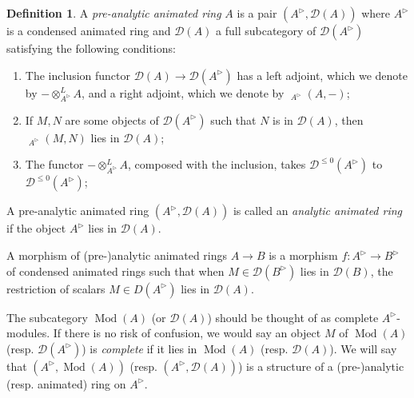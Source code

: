 \documentclass{article}
\theoremstyle{plain}
\theoremstyle{definition}
\newtheorem{defi}[thm]{Definition}
\theoremstyle{remark}
\DeclareMathOperator{\rhoms}{\underline{RHom}}
\DeclareMathOperator{\modcat}{Mod}
\newcommand{\dten}{\otimes ^{L}}
\newcommand{\huflag}{\triangleright}
\newcommand{\D}{\mathcal{D}}
\newcommand{\resp}[1]{{\color{respcolor}(resp. #1)}}
\begin{document}
\begin{defi}
A \emph{pre-analytic animated ring} $ A $ is a pair $ (A ^{\huflag}, \D(A)) $ where $ A ^{\huflag} $ is a condensed animated ring and
$ \D (A) $ a full subcategory of $ \D (A ^{\huflag}) $ satisfying the following conditions:

\begin{enumerate}
\item The inclusion functor $ \D (A)\to \D (A ^{\huflag}) $ has a left adjoint, which we denote by $ -\dten _{A ^{\huflag}} A $,
and a right adjoint, which we denote by $ \rhoms _{A ^{\huflag}}(A, -) $;
\item If $ M,N $ are some objects of $ \D (A ^{\huflag}) $ such that $ N $ is in $\D (A) $, then $ \rhoms _{A ^{\huflag}} (M, N) $ lies in $ \D (A) $;
\item The functor $ -\dten _{A ^{\huflag}} A $, composed with the inclusion, takes $ \D ^{\leq 0}(A ^{\huflag}) $ to $ \D ^{\leq 0}(A ^{\huflag}) $;
\end{enumerate}
A pre-analytic animated ring $ (A ^{\huflag}, \D (A)) $ is called an \emph{analytic animated ring} if
the object $ A ^{\huflag} $ lies in $ \D (A) $.

A morphism of (pre-)analytic animated rings $ A\to B $ is a morphism $ f: A ^{\huflag}\to B ^{\huflag} $ of condensed animated rings such that when
$ M\in \D (B ^{\huflag}) $ lies in $ \D (B) $, the restriction of scalars $ M \in D (A ^{\huflag}) $ lies in $ \D (A) $.
\end{defi}

The subcategory $ \modcat (A) $ (or $ \D (A) $) should be thought of as complete $ A ^{\huflag} $-modules.
If there is no risk of confusion, we would say an object $ M $ of $ \modcat (A) $ \resp{$ \D (A ^{\huflag}) $} is
\emph{complete} if it lies in $ \modcat (A) $ \resp{$\D (A) $}.
We will say that $ (A ^{\huflag}, \modcat (A)) $ \resp{$ (A ^{\huflag}, \D (A)) $} is a structure of a (pre-)analytic \resp{animated} ring on $ A ^{\huflag} $.
\end{document}

